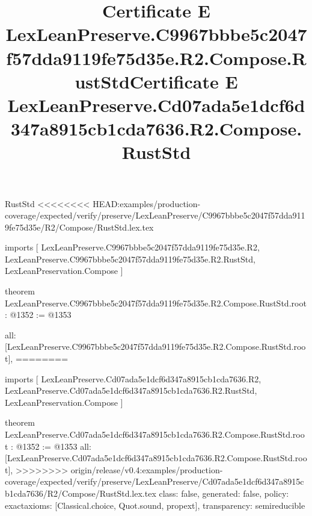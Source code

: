 \begin{lexlean}{RustStd}
<<<<<<<< HEAD:examples/production-coverage/expected/verify/preserve/LexLeanPreserve/C9967bbbe5c2047f57dda9119fe75d35e/R2/Compose/RustStd.lex.tex
\title{Certificate E LexLeanPreserve.C9967bbbe5c2047f57dda9119fe75d35e.R2.Compose.RustStd}
\begin{coremodule}
imports [
  LexLeanPreserve.C9967bbbe5c2047f57dda9119fe75d35e.R2,
  LexLeanPreserve.C9967bbbe5c2047f57dda9119fe75d35e.R2.RustStd,
  LexLeanPreservation.Compose
]

theorem LexLeanPreserve.C9967bbbe5c2047f57dda9119fe75d35e.R2.Compose.RustStd.root : @1352 := @1353 {
  all: [LexLeanPreserve.C9967bbbe5c2047f57dda9119fe75d35e.R2.Compose.RustStd.root],
========
\title{Certificate E LexLeanPreserve.Cd07ada5e1dcf6d347a8915cb1cda7636.R2.Compose.RustStd}
\begin{coremodule}
imports [
  LexLeanPreserve.Cd07ada5e1dcf6d347a8915cb1cda7636.R2,
  LexLeanPreserve.Cd07ada5e1dcf6d347a8915cb1cda7636.R2.RustStd,
  LexLeanPreservation.Compose
]

theorem LexLeanPreserve.Cd07ada5e1dcf6d347a8915cb1cda7636.R2.Compose.RustStd.root : @1352 := @1353 {
  all: [LexLeanPreserve.Cd07ada5e1dcf6d347a8915cb1cda7636.R2.Compose.RustStd.root],
>>>>>>>> origin/release/v0.4:examples/production-coverage/expected/verify/preserve/LexLeanPreserve/Cd07ada5e1dcf6d347a8915cb1cda7636/R2/Compose/RustStd.lex.tex
  class: false,
  generated: false,
  policy: exact{axioms: [Classical.choice, Quot.sound, propext]},
  transparency: semireducible
}


\end{coremodule}}
\end{coremodule}
\end{lexlean}
